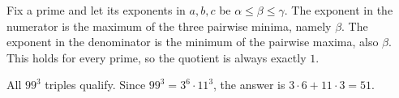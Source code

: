 Fix a prime and let its exponents in $a,b,c$ be $\alpha\le\beta\le\gamma$. The exponent in the numerator is the maximum of the three pairwise minima, namely $\beta$. The exponent in the denominator is the minimum of the pairwise maxima, also $\beta$. This holds for every prime, so the quotient is always exactly $1$.

All $99^3$ triples qualify. Since $99^3=3^6\cdot11^3$, the answer is $\boxed{3\cdot6+11\cdot3=51}$.
